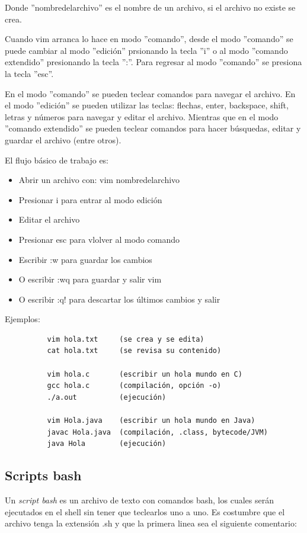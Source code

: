 \documentclass[12pt]{article}
\begin{document}
Donde ''{\ttfamily nombredelarchivo}'' es el nombre de un archivo, si el archivo no existe se crea. 
 
Cuando vim arranca lo hace en modo ''comando'', desde el modo ''comando'' se puede cambiar al modo ''edición'' prsionando la tecla ''i'' o al modo ''comando extendido'' presionando la tecla '':''. Para regresar al modo ''comando'' se presiona la tecla ''esc''. 

En el modo ''comando'' se pueden teclear comandos para navegar el archivo. En el modo ''edición'' se pueden utilizar las teclas: flechas, enter, backspace, shift, letras y números para navegar y editar el archivo. Mientras que en el modo ''comando extendido'' se pueden teclear comandos para hacer búsquedas, editar y guardar el archivo (entre otros).

El flujo básico de trabajo es:

\begin{itemize}
\item Abrir un archivo con:  {\ttfamily vim nombredelarchivo}
\item Presionar {\ttfamily i} para entrar al modo edición
\item Editar el archivo
\item Presionar {\ttfamily esc} para vlolver al modo comando
\item Escribir {\ttfamily :w} para guardar los cambios
\item O escribir {\ttfamily :wq} para guardar y salir vim
\item O escribir {\ttfamily :q!} para descartar los últimos cambios y salir 
\end{itemize}   

Ejemplos:
\begin{verbatim}
          vim hola.txt     (se crea y se edita)
          cat hola.txt     (se revisa su contenido)
          
          vim hola.c       (escribir un hola mundo en C)
          gcc hola.c       (compilación, opción -o)
          ./a.out          (ejecución)
          
          vim Hola.java    (escribir un hola mundo en Java)
          javac Hola.java  (compilación, .class, bytecode/JVM)
          java Hola        (ejecución)
\end{verbatim}

\subsection{Scripts bash}
Un \textit{script bash} es un archivo de texto con comandos bash, los cuales serán ejecutados en el shell sin tener que teclearlos uno a uno. Es costumbre que el archivo tenga la extensión {\ttfamily .sh} y que la primera linea sea el siguiente comentario:
\end{document}
